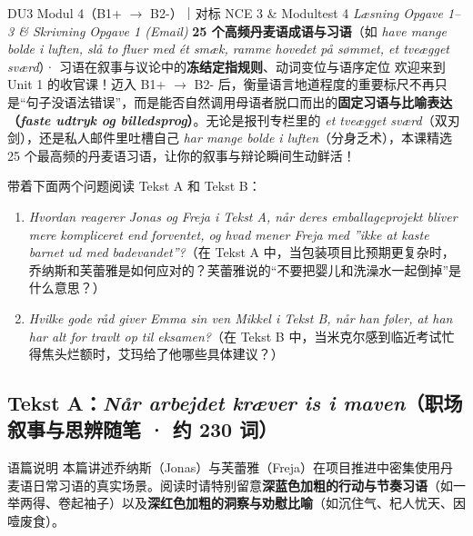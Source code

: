 {DU3 Modul 4（B1+ $\rightarrow$ B2-）｜对标 NCE 3 \& Modultest 4 \textit{Læsning Opgave 1--3 \& Skrivning Opgave 1 (Email)}}
{\textbf{25 个高频丹麦语成语与习语}（如 \textit{have mange bolde i luften, slå to fluer med ét smæk, ramme hovedet på sømmet, et tveægget sværd}）· 习语在叙事与议论中的\textbf{冻结定指规则}、动词变位与语序定位}
{欢迎来到 Unit 1 的收官课！迈入 B1+ $\rightarrow$ B2- 后，衡量语言地道程度的重要标尺不再只是“句子没语法错误”，而是能否自然调用母语者脱口而出的\textbf{固定习语与比喻表达（\textit{faste udtryk og billedsprog}）}。无论是报刊专栏里的 \textit{et tveægget sværd}（双刃剑），还是私人邮件里吐槽自己 \textit{har mange bolde i luften}（分身乏术），本课精选 25 个最高频的丹麦语习语，让你的叙事与辩论瞬间生动鲜活！}

\begin{foerduleaeser}
带着下面两个问题阅读 Tekst A 和 Tekst B：
\begin{enumerate}
  \item \textit{Hvordan reagerer Jonas og Freja i Tekst A, når deres emballageprojekt bliver mere kompliceret end forventet, og hvad mener Freja med ”ikke at kaste barnet ud med badevandet”?}（在 Tekst A 中，当包装项目比预期更复杂时，乔纳斯和芙蕾雅是如何应对的？芙蕾雅说的“不要把婴儿和洗澡水一起倒掉”是什么意思？）
  \item \textit{Hvilke gode råd giver Emma sin ven Mikkel i Tekst B, når han føler, at han har alt for travlt op til eksamen?}（在 Tekst B 中，当米克尔感到临近考试忙得焦头烂额时，艾玛给了他哪些具体建议？）
\end{enumerate}
\end{foerduleaeser}


\subsection*{Tekst A：\textit{Når arbejdet kræver is i maven}（职场叙事与思辨随笔 · 约 230 词）}

\begin{tipbox}{语篇说明}
本篇讲述乔纳斯（Jonas）与芙蕾雅（Freja）在项目推进中密集使用丹麦语日常习语的真实场景。阅读时请特别留意\textbf{\color{NCDNavy}深蓝色加粗的行动与节奏习语}（如一举两得、卷起袖子）以及\textbf{\color{NCDRed}深红色加粗的洞察与劝慰比喻}（如沉住气、杞人忧天、因噎废食）。
\end{tipbox}

